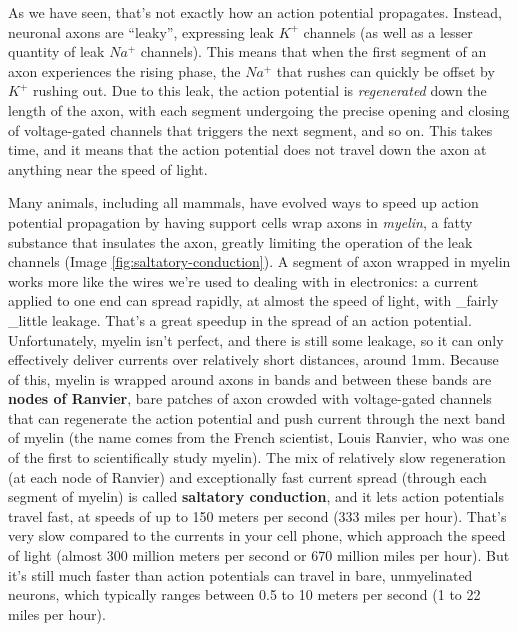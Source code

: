 \documentclass[
]{book}
\begin{document}
As we have seen, that's not exactly how an action potential propagates. Instead, neuronal axons are ``leaky'', expressing leak \(K^+\) channels (as well as a lesser quantity of leak \(Na^+\) channels). This means that when the first segment of an axon experiences the rising phase, the \(Na^+\) that rushes can quickly be offset by \(K^+\) rushing out. Due to this leak, the action potential is \emph{regenerated} down the length of the axon, with each segment undergoing the precise opening and closing of voltage-gated channels that triggers the next segment, and so on. This takes time, and it means that the action potential does not travel down the axon at anything near the speed of light.

Many animals, including all mammals, have evolved ways to speed up action potential propagation by having support cells wrap axons in \emph{myelin}, a fatty substance that insulates the axon, greatly limiting the operation of the leak channels (Image \ref{fig:saltatory-conduction}). A segment of axon wrapped in myelin works more like the wires we're used to dealing with in electronics: a current applied to one end can spread rapidly, at almost the speed of light, with \_fairly \_little leakage. That's a great speedup in the spread of an action potential. Unfortunately, myelin isn't perfect, and there is still some leakage, so it can only effectively deliver currents over relatively short distances, around 1mm. Because of this, myelin is wrapped around axons in bands and between these bands are \textbf{nodes of Ranvier}, bare patches of axon crowded with voltage-gated channels that can regenerate the action potential and push current through the next band of myelin (the name comes from the French scientist, Louis Ranvier, who was one of the first to scientifically study myelin). The mix of relatively slow regeneration (at each node of Ranvier) and exceptionally fast current spread (through each segment of myelin) is called \textbf{saltatory conduction}, and it lets action potentials travel fast, at speeds of up to 150 meters per second (333 miles per hour). That's very slow compared to the currents in your cell phone, which approach the speed of light (almost 300 million meters per second or 670 million miles per hour). But it's still much faster than action potentials can travel in bare, unmyelinated neurons, which typically ranges between 0.5 to 10 meters per second (1 to 22 miles per hour).
\end{document}
